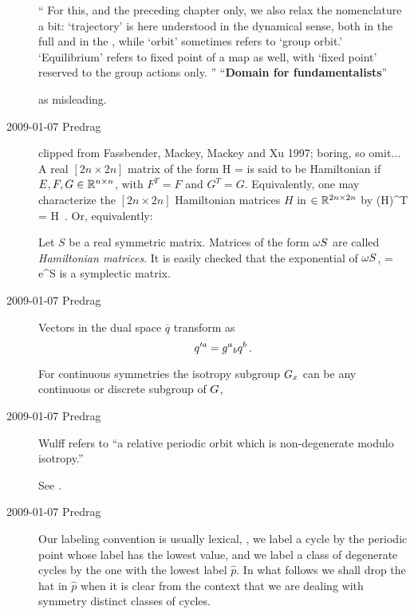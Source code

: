\begin{description}
``
For this, and the preceding chapter only, we also relax the nomenclature
a bit:
   `trajectory' is here understood in the dynamical sense,
   both in the full and in the \reducedsp,
   while `orbit' sometimes refers to `group orbit.'
   `Equilibrium' refers to fixed point of a map as well,
   with `fixed point' reserved to the group actions only.
''
``{\bf Domain for fundamentalists}''

as misleading.

\item[2009-01-07 Predrag]
clipped from Fassbender, Mackey, Mackey and Xu 1997; boring, so omit...
A real $[\!2n\times\!2n]$ matrix of the form
\beq
H = 
is said to be Hamiltonian if $E, F, G \in \reals^{n \times n}$,
 with $F^T = F$ and $G^T = G$. Equivalently, one
may characterize the $[\!2n\times\!2n]$  Hamiltonian matrices $H$
in $\in \reals^{2n \times 2n}$ by
\beq
({\bf \omega}H)^T = {\bf \omega}H
\,.
Or, equivalently:

Let $S$ be a real symmetric matrix. Matrices of the form ${\bf \omega}S$ are
called \emph{Hamiltonian matrices}. It is easily checked that
the exponential of
${\bf \omega}S$,
\beq
\LieEl = e^{{\bf \omega}S}
is a symplectic matrix.

\item[2009-01-07 Predrag]
Vectors in the dual space $\overline{q}$
transform as
\[
q'^a = \LieEl^a{}_b q^b \, .
\]


For continuous symmetries the isotropy subgroup $G_{{x}}$
can be any continuous or discrete subgroup of $G$,

\item[2009-01-07 Predrag]

Wulff refers to ``a relative periodic orbit which
is non-degenerate modulo isotropy.''

See
.


\item[2009-01-07 Predrag]
Our labeling convention is usually
lexical, \ie, we label a cycle by the periodic point whose label has the
lowest value, and we label a class of degenerate cycles
by the one with the lowest label $\hat{p}$.
In what follows we shall drop the hat in $\hat{p}$ when it is clear
from the context that we are dealing with symmetry distinct classes
of cycles.




\end{description}
